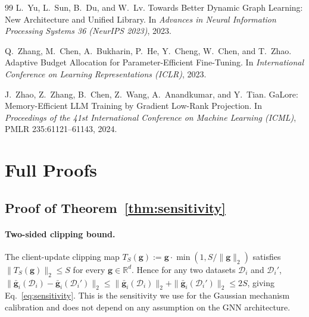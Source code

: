 \documentclass[11pt]{article}
\theoremstyle{plain}
\theoremstyle{definition}
\theoremstyle{remark}
\newcommand{\R}{\mathbb{R}}
\newcommand{\Dcal}{\mathcal{D}}
\newcommand{\norm}[1]{\|#1\|}
\begin{document}
\begin{thebibliography}{99}
L.~Yu, L.~Sun, B.~Du, and W.~Lv.
\newblock Towards Better Dynamic Graph Learning: New Architecture and Unified Library.
\newblock In \emph{Advances in Neural Information Processing Systems 36 (NeurIPS 2023)}, 2023.

Q.~Zhang, M.~Chen, A.~Bukharin, P.~He, Y.~Cheng, W.~Chen, and T.~Zhao.
\newblock Adaptive Budget Allocation for Parameter-Efficient Fine-Tuning.
\newblock In \emph{International Conference on Learning Representations (ICLR)}, 2023.

J.~Zhao, Z.~Zhang, B.~Chen, Z.~Wang, A.~Anandkumar, and Y.~Tian.
\newblock GaLore: Memory-Efficient LLM Training by Gradient Low-Rank Projection.
\newblock In \emph{Proceedings of the 41st International Conference on Machine Learning (ICML)}, PMLR 235:61121--61143, 2024.

\end{thebibliography}

\appendix

\section{Full Proofs}
\label{app:proofs}

\subsection{Proof of Theorem~\ref{thm:sensitivity}}

\paragraph{Two-sided clipping bound.}
The client-update clipping map
$T_S(\mathbf{g}):=\mathbf{g}\cdot\min(1,S/\norm{\mathbf{g}}_2)$
satisfies $\norm{T_S(\mathbf{g})}_2\le S$ for every
$\mathbf{g}\in\R^d$. Hence for any two datasets $\Dcal_i$ and
$\Dcal_i'$,
$\norm{\bar{\mathbf{g}}_i(\Dcal_i)-\bar{\mathbf{g}}_i(\Dcal_i')}_2
\le \norm{\bar{\mathbf{g}}_i(\Dcal_i)}_2 +
\norm{\bar{\mathbf{g}}_i(\Dcal_i')}_2 \le 2S$, giving
Eq.~\eqref{eq:sensitivity}. This is the sensitivity we use for the
Gaussian mechanism calibration and does not depend on any
assumption on the GNN architecture.
\end{document}
